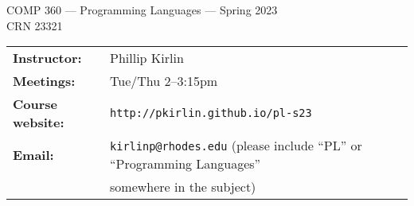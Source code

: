 \documentclass [letterpaper,11pt]{article}
\begin{document}
\begin{center}
\Large COMP 360 --- Programming Languages  --- Spring 2023
\\ \normalsize CRN 23321
\end{center}

\noindent\begin{tabular}{@{}ll}
\textbf{Instructor:} & Phillip Kirlin \\
\textbf{Meetings:} & Tue/Thu 2--3:15pm \\
\textbf{Course website:} & \texttt{http://pkirlin.github.io/pl-s23}\\
\textbf{Email:} & \texttt{kirlinp@rhodes.edu} (please include ``PL'' or ``Programming Languages''\\
\phantom{\textbf{Email:}} & somewhere in the subject)\\
\end{tabular}
\end{document}
